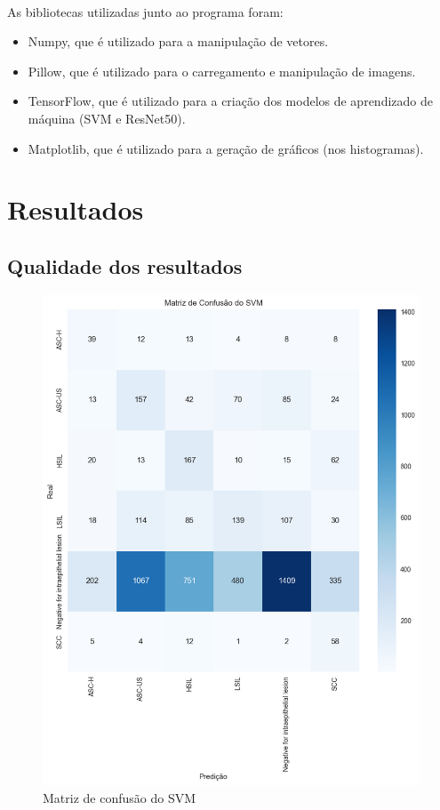 \documentclass[12pt]{article}
\begin{document}
\paragraph{}As bibliotecas utilizadas junto ao programa foram:

\begin{itemize}
    \item Numpy, que é utilizado para a manipulação de vetores.
    
    \item Pillow, que é utilizado para o carregamento e manipulação de imagens.
    
    \item TensorFlow, que é utilizado para a criação dos modelos de aprendizado de máquina (SVM e ResNet50).

    \item Matplotlib, que é utilizado para a geração de gráficos (nos histogramas).
\end{itemize}

\section{Resultados}

\subsection{Qualidade dos resultados}

\begin{figure}
    \centering
    \includegraphics[width=\textwidth]{Matriz confusao SVM.png}
    \caption{Matriz de confusão do SVM}
    \label{fig:matriz-confusao-svm}
\end{figure}
\end{document}
